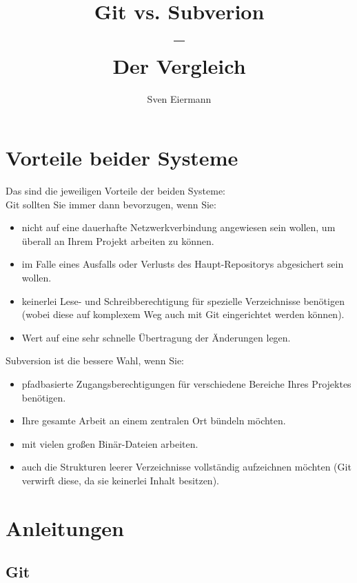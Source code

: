 \documentclass[11pt]{article}
\title{\textbf{Git vs. Subverion \\ -- \\ Der Vergleich }}
\author{Sven Eiermann}
\date{}
\begin{document}
\maketitle

\section{Vorteile beider Systeme}

Das sind die jeweiligen Vorteile der beiden Systeme: \\[12pt]

Git sollten Sie immer dann bevorzugen, wenn Sie:

\begin{itemize}

\item    nicht auf eine dauerhafte Netzwerkverbindung angewiesen sein wollen, um überall an Ihrem Projekt arbeiten zu können.
  \item  im Falle eines Ausfalls oder Verlusts des Haupt-Repositorys abgesichert sein wollen.
    \item keinerlei Lese- und Schreibberechtigung für spezielle Verzeichnisse benötigen (wobei diese auf komplexem Weg auch mit Git eingerichtet werden können).
   \item  Wert auf eine sehr schnelle Übertragung der Änderungen legen.
\end{itemize}


Subversion ist die bessere Wahl, wenn Sie:


\begin{itemize}
    \item pfadbasierte Zugangsberechtigungen für verschiedene Bereiche Ihres Projektes benötigen.
    \item Ihre gesamte Arbeit an einem zentralen Ort bündeln möchten.
    \item mit vielen großen Binär-Dateien arbeiten.
    \item auch die Strukturen leerer Verzeichnisse vollständig aufzeichnen möchten (Git verwirft diese, da sie keinerlei Inhalt besitzen).
\end{itemize}

\section{Anleitungen}
\subsection{Git}
\end{document}
